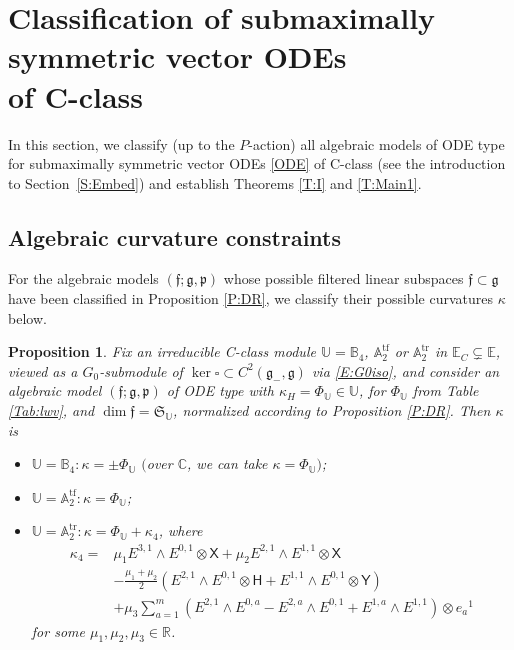 \documentclass[pdftex]{sigma}%
\newcommand\tensor{\otimes}
\DeclareMathOperator{\tf}{tf}
\DeclareMathOperator{\tr}{tr}
\newcommand{\g}{\mathfrak{g}}
\newcommand\ff{\mathfrak{f}}
\newcommand\fg{\mathfrak{g}}
\newcommand\fp{\mathfrak{p}}
\newcommand\fS{\mathfrak{S}}
\newcommand{\R}{\mathbb{R}}
\newcommand{\C}{\mathbb{C}}
\newcommand\bbE{\mathbb{E}}
\newcommand\bbU{\mathbb{U}}
\newcommand\bbA{\mathbb{A}}
\newcommand\bbB{\mathbb{B}}
\newcommand\sfX{\mathsf{X}}
\newcommand\sfH{\mathsf{H}}
\newcommand\sfY{\mathsf{Y}}
\numberwithin{equation}{section}
\newtheorem{Proposition}[Theorem]{Proposition}
 { \theoremstyle{definition}
\newtheorem{Definition}[Theorem]{Definition}
\newtheorem{Note}[Theorem]{Note}
\newtheorem{Example}[Theorem]{Example}
\newtheorem{Remark}[Theorem]{Remark} }
\begin{document}
 \section[Classification of submaximally symmetric vector ODEs of C-class]{Classification of submaximally symmetric vector ODEs\\ of C-class}
\label{S:curvature}

In this section, we classify (up to the $P$-action) all algebraic models of ODE type for submaximally symmetric vector ODEs \eqref{ODE} of C-class (see the introduction to Section~\ref{S:Embed}) and establish Theorems \ref{T:I} and \ref{T:Main1}.

\subsection{Algebraic curvature constraints} \label{S:k}

For the algebraic models $(\ff;\g,\fp)$ whose possible filtered linear subspaces $\ff \subset \g$ have been classified in Proposition \ref{P:DR}, we classify their possible curvatures $\kappa$ below.

\begin{Proposition}\label{P:k}
Fix an irreducible C-class module $\bbU = \bbB_4$, $\bbA_2^{\tf}$ or $\bbA_2^{\tr}$ in $\bbE_C \subsetneq \bbE$, viewed as a $G_0$-submodule of $\ker\square \subset C^2(\fg_-,\fg)$ via \eqref{E:G0iso}, and consider an algebraic model $(\ff; \g, \fp)$ of ODE type with $\kappa_H = \Phi_{\bbU} \in \bbU$, for $\Phi_\bbU$ from Table {\rm \ref{Tab:lwv}}, and $\dim \ff = \fS_{\bbU}$, normalized according to Proposition {\rm \ref{P:DR}}. Then $\kappa$ is
\begin{itemize}\itemsep=0pt
\item [$(a)$] $\bbU = \bbB_4\colon \kappa = \pm\Phi_{\bbU}$ $($over $\C$, we can take $\kappa = \Phi_{\bbU})$;
\item[$(b)$] $\bbU = \bbA_2^{\tf}\colon\kappa = \Phi_{\bbU}$;
\item[$(c)$] $\bbU = \bbA_2^{\tr}\colon\kappa = \Phi_{\bbU} + \kappa_4$, where
\begin{align}
\kappa_4 ={}& \mu_1 E^{3,1} \wedge E^{0,1} \tensor \sfX + \mu_2 E^{2,1} \wedge E^{1,1} \tensor \sfX \nonumber \\
& -\frac{\mu_1 + \mu_2}{2} \left( E^{2,1} \wedge E^{0,1} \tensor \sfH + E^{1,1} \wedge E^{0,1} \tensor \sfY \right)\nonumber\\
& + \mu_3\sum_{a=1}^m \left(E^{2,1} \wedge E^{0,a} - E^{2,a} \wedge E^{0,1}+ E^{1,a} \wedge E^{1,1} \right) \tensor e_a{}^1\label{E:kappa4}
\end{align}
for some $\mu_1,\mu_2,\mu_3 \in \R$.
\end{itemize}
\end{Proposition}
\end{document}

